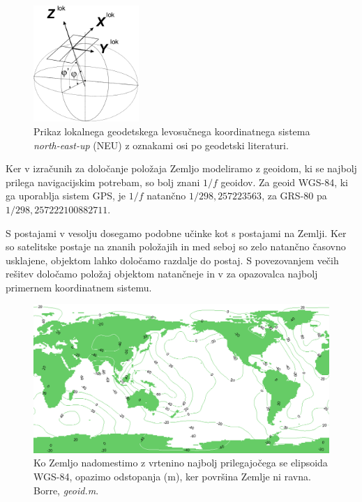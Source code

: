 \begin{figure}%
	\vspace{-120pt}
	\begin{center}
		\includegraphics[width=4cm]{Predavanja/05_SatLastPolozaj/figs/2009-02-28-Skica-LokGeod.png}
	\end{center}
	\vspace{-10pt}
	\caption{Prikaz lokalnega geodetskega levosučnega koordinatnega sistema \textit{north-east-up} (NEU) z oznakami osi po geodetski literaturi. }
	\label{Fig_LokGeodet}
	\vspace{-40pt}
\end{figure}

Ker v izračunih za določanje položaja Zemljo modeliramo z geoidom, ki se najbolj prilega navigacijskim potrebam, so bolj znani $1/f$ geoidov. Za geoid WGS-84, ki ga uporablja sistem GPS, je $1/f$ natančno $1/298,257223563$, za GRS-80 pa $1/298,257222100882711$. 


S postajami v vesolju dosegamo podobne učinke kot s postajami na Zemlji. Ker so satelitske postaje na znanih položajih in med seboj so zelo natančno časovno usklajene, objektom lahko določamo razdalje do postaj. S povezovanjem večih rešitev določamo položaj objektom natančneje in v za opazovalca najbolj primernem koordinatnem sistemu.



\begin{figure}[!ht]
	\centering
	\vspace{-15pt}
	\includegraphics[width=1.0\textwidth]{Predavanja/05_SatLastPolozaj/figs/geoid.png} 
	\vspace{-10pt}
	\caption{Ko Zemljo nadomestimo z vrtenino najbolj prilegajočega se elipsoida WGS-84, opazimo odstopanja (m), ker površina Zemlje ni ravna. Borre, \textit{geoid.m}.}
	\label{Fig_PrikazGeoid}
\end{figure}


